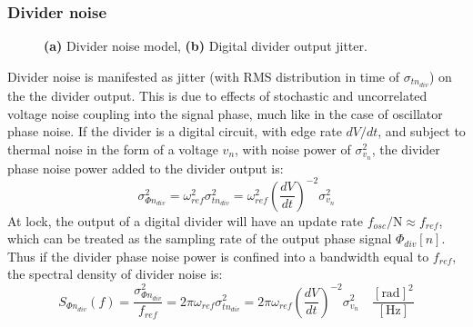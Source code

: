 \subsubsection{Divider noise}
	\begin{figure}[htb!]
	    \centering
	    \begin{subfigure}{0.5\textwidth}
	        \centering
	        
	        \caption{ }
	        \label{fig:div_pn_model}
	    \end{subfigure}%
	    \begin{subfigure}{0.5\textwidth}
	        \centering
	        
	        \caption{ }
	        \label{fig:div_jitter}
	    \end{subfigure}
	    \label{fig:div_pn}
	    \caption{\textbf{(a)} Divider noise model, \textbf{(b)} Digital divider output jitter.}
	\end{figure}
	\FloatBarrier
	Divider noise is manifested as jitter (with RMS distribution in time of $\sigma_{t n_{div}}$) on the the divider output. This is due to effects of stochastic and uncorrelated voltage noise coupling into the signal phase, much like in the case of oscillator phase noise. If the divider is a digital circuit, with edge rate $dV/dt$, and subject to thermal noise in the form of a  voltage $v_n$, with noise power of $\sigma_{v_n}^2$, the divider phase noise power added to the divider output is:
	\begin{equation}
		\sigma_{\Phi n_{div}}^2 = \omega^2_{ref}\sigma^2_{t n_{div}}  =\omega^2_{ref}\left(\frac{dV}{dt}\right)^{-2}\sigma_{v_n}^2
	\end{equation}
	At lock, the output of a digital divider will have an update rate $f_{{osc}}/\mathrm{N} \approx f_{ref}$, which can be treated as the sampling rate of the output phase signal $\Phi_{div}[n]$. Thus if the divider phase noise power is confined into a bandwidth equal to $f_{ref}$, the spectral density of divider noise is:
	\begin{equation}
		S_{\Phi n_{div}}(f) = \frac{\sigma_{\Phi n_{div}}^2}{f_{ref}} = 2\pi\omega_{ref}\sigma^2_{t n_{div}}  =2\pi\omega_{ref}\left(\frac{dV}{dt}\right)^{-2}\sigma_{v_n}^2\hspace{1em}\frac{[\text{rad}]^2}{[\text{Hz}]}
	\end{equation}

